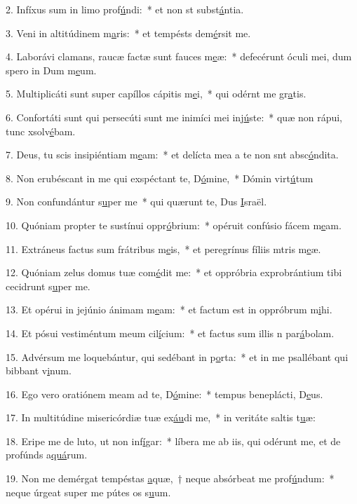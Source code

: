 2. Infíxus sum in limo prof\uline{ú}ndi:~* et non st subst\uline{á}ntia.\par 
3. Veni in altitúdinem m\uline{a}ris:~* et tempésts dem\uline{é}rsit me.\par 
4. Laborávi clamans, raucæ factæ sunt fauces m\uline{e}æ:~* defecérunt óculi mei, dum spero in Dum m\uline{e}um.\par 
5. Multiplicáti sunt super capíllos cápitis m\uline{e}i,~* qui odérnt me gr\uline{a}tis.\par 
6. Confortáti sunt qui persecúti sunt me inimíci mei inj\uline{ú}ste:~* quæ non rápui, tunc xsolv\uline{é}bam.\par 
7. Deus, tu scis insipiéntiam m\uline{e}am:~* et delícta mea a te non snt absc\uline{ó}ndita.\par 
8. Non erubéscant in me qui exspéctant te, D\uline{ó}mine,~* Dómin virt\uline{ú}tum\par 
9. Non confundántur s\uline{u}per me~* qui quærunt te, Dus \uline{I}sraël.\par 
10. Quóniam propter te sustínui oppr\uline{ó}brium:~* opéruit confúsio fácem m\uline{e}am.\par 
11. Extráneus factus sum frátribus m\uline{e}is,~* et peregrínus fíliis mtris m\uline{e}æ.\par 
12. Quóniam zelus domus tuæ com\uline{é}dit me:~* et oppróbria exprobrántium tibi cecidrunt s\uline{u}per me.\par 
13. Et opérui in jejúnio ánimam m\uline{e}am:~* et factum est in oppróbrum m\uline{i}hi.\par 
14. Et pósui vestiméntum meum cil\uline{í}cium:~* et factus sum illis n par\uline{á}bolam.\par 
15. Advérsum me loquebántur, qui sedébant in p\uline{o}rta:~* et in me psallébant qui bibbant v\uline{i}num.\par 
16. Ego vero oratiónem meam ad te, D\uline{ó}mine:~* tempus beneplácti, D\uline{e}us.\par 
17. In multitúdine misericórdiæ tuæ ex\uline{áu}di me,~* in veritáte saltis t\uline{u}æ:\par 
18. Eripe me de luto, ut non inf\uline{í}gar:~* líbera me ab iis, qui odérunt me, et de profúnds a\uline{quá}rum.\par 
19. Non me demérgat tempéstas \uline{a}quæ,~† neque absórbeat me prof\uline{ú}ndum:~* neque úrgeat super me pútes os s\uline{u}um.\par 

